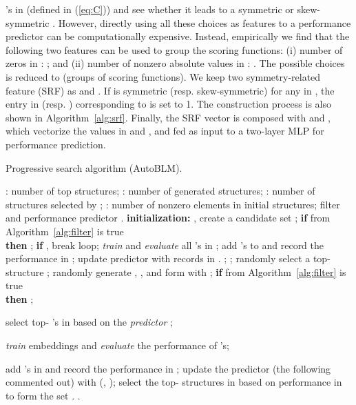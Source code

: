 \documentclass[10pt,journal,compsoc]{IEEEtran}
\begin{document}
's in  (defined in (\ref{eq:C}))  and see whether it 
leads to a symmetric or skew-symmetric
.
However, 
directly using all these  choices as features to a performance predictor 
can be computationally expensive.
Instead,
empirically we find  
that
the following two features can be used to group
the scoring functions:
(i) number of zeros in :
;
and (ii)
number of nonzero absolute values in :
.
The possible choices
is reduced 
to  (groups of scoring functions).
We keep two 
	symmetry-related feature (SRF)
	as
	 and .
If  is symmetric (resp. skew-symmetric) for any
 in ,
the 
entry in  (resp. ) 
corresponding 
to  
is set to 1.
The construction process is also shown in Algorithm~\ref{alg:srf}.
Finally,
the SRF vector is 
composed with  and ,
which vectorize the values in  and ,
and
fed as input 
to a two-layer MLP
for performance prediction.

\begin{algorithm}[t]
	\caption{Progressive search algorithm (AutoBLM).}
	\label{alg:greedy}
	\small
	\begin{algorithmic}[1]
		\REQUIRE
		: number of top structures;
		: number of generated structures;
		: number of structures selected by ;
		:  number of nonzero elements in initial structures;
		filter  and performance predictor .
		\STATE \textbf{initialization:} 
		, create a candidate set ;
		\label{step:greedyinit}
		 \label{step:Kstart}
		\STATE \textbf{if}  from Algorithm~\ref{alg:filter} is true \\ \textbf{then} ;
		\STATE \textbf{if} , break loop;
		\ENDFOR  \label{step:Kend}
		\STATE \textit{train} and \textit{evaluate} all 's in ;
		\STATE add 's to  and record the performance in ;
		\STATE update predictor  with records in .
		\REPEAT
		\STATE ;  \label{step:greedyb}
		\STATE ;
		\REPEAT	 \label{step:gen-start}
		\STATE randomly select a top- structure ; \label{step:top-struct}
		\STATE randomly generate , , 
		and form  with
;
		\label{step:gen}
		\STATE \textbf{if}  from Algorithm~\ref{alg:filter} is true \\ \textbf{then} ;
\label{step:filter}
		\UNTIL{}  \label{step:gen-end}
		
		\STATE select top- 's in  based on the \textit{predictor} ;
		\label{step:predict}    
		
		\STATE \textit{train} embeddings and \textit{evaluate} the performance of 's;
		\label{step:train}
		
		\STATE add 's in  and record the performance in ;
		\label{step:record}
\STATE update the predictor  (the following commented out)
		 with (, );
		\label{step:update} 
		\STATE select the top- structures in  based on performance in  to form the set .
		\RETURN .
		\label{step:return}
	\end{algorithmic}
\end{algorithm}
\end{document}
